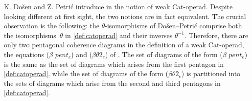 \begin{rem}
\label{rem:DPLA}
K. Do{\v s}en and Z. Petri{\'c} introduce in \cite[Section 12]{DP15} the notion of weak Cat-operad.
Despite looking different at first sight, the two notions are in fact equivalent.
The crucial observation is the following: the $\theta$-isomorphisms of Do{\v s}en--Petri{\'c} comprise both the isomorphisms~$\theta$ in \cref{def:catoperad} and their inverses $\theta^{-1}$.
Therefore, there are only two pentagonal coherence diagrams in the definition of a weak Cat-operad, the equations ($\beta$ $pent_e$) and ($\beta\theta 2_e$) of \cite[Section 9]{DP15}.
The set of diagrams of the form ($\beta$ $pent_e$) is the same as the set of diagrams which arises from the first pentagon in \cref{def:catoperad}, while the set of diagrams of the form ($\beta\theta 2_e$) is partitioned into the sets of diagrams which arise from the second and third pentagons in \cref{def:catoperad}.
\end{rem}


